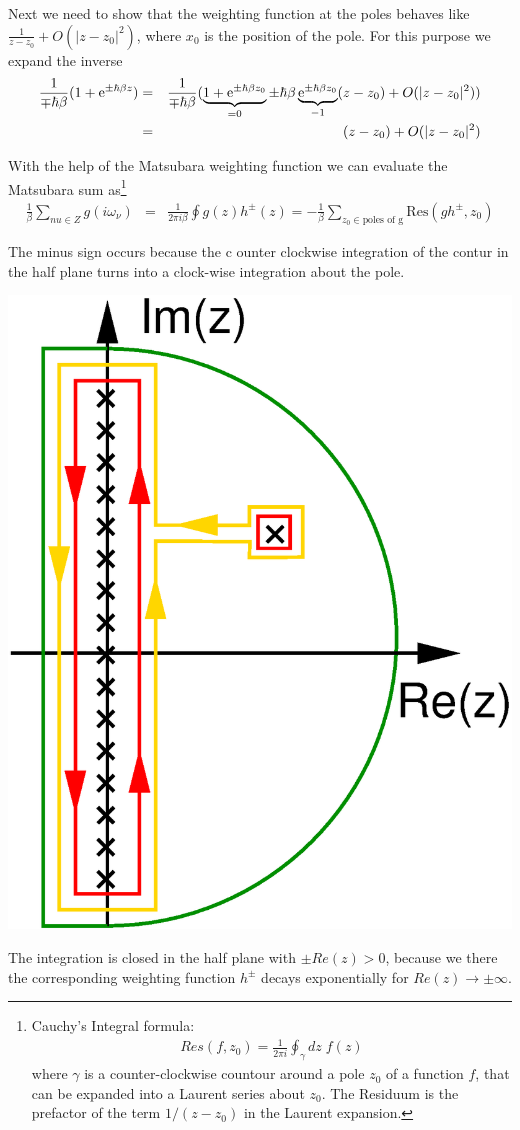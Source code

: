 \documentclass[11pt,a4paper]{report}
\begin{document}
Next we need to show that the weighting function at the poles behaves
like $\frac{1}{z-z_0}+O(|z-z_0|^2)$, where $x_0$ is the position of the pole.
For this purpose we expand the inverse
\begin{eqnarray}
\frac{1}{\mp\hbar\beta}(1+\mathrm{e}^{\pm\hbar\beta z})
&=&\frac{1}{\mp\hbar\beta}
(\underbrace{1+\mathrm{e}^{\pm\hbar\beta z_0}}_{=0} 
\pm\hbar\beta\underbrace{\mathrm{e}^{\pm\hbar\beta z_0}}_{-1}(z-z_0)+O(|z-z_0|^2) )
\\
&=&(z-z_0)+O(|z-z_0|^2) 
\end{eqnarray}



With the help of the Matsubara weighting function we can evaluate the
Matsubara sum as\footnote{Cauchy's Integral formula:
\begin{eqnarray*}
Res(f,z_0)=\frac{1}{2\pi i}\oint_\gamma dz\; f(z)
\end{eqnarray*}
where $\gamma$ is a counter-clockwise countour around a pole $z_0$ of
a function $f$, that can be expanded into a Laurent series about
$z_0$. The Residuum is the prefactor of the term $1/(z-z_0)$ in the
Laurent expansion.}
\begin{eqnarray}
\frac{1}{\beta}\sum_{nu\in Z}g(i\omega_\nu)&=&
\frac{1}{2\pi i\beta}\oint g(z) h^{\pm}(z)
=-\frac{1}{\beta}\sum_{z_0\in\text{poles of g}}
\text{Res}(gh^{\pm},z_0)
\end{eqnarray}





The minus sign occurs because the c ounter clockwise integration of
the contur in the half plane turns into a clock-wise integration about
the pole.

\begin{center}
\includegraphics[width=0.25\linewidth]{Figs/Xfig/Matsubaracontour/contour.eps}
\end{center}

The integration is closed in the half plane with $\pm Re(z)>0$, because
we there the corresponding weighting function $h^{\pm}$ decays
exponentially for $Re(z)\rightarrow\pm\infty$.
\end{document}
